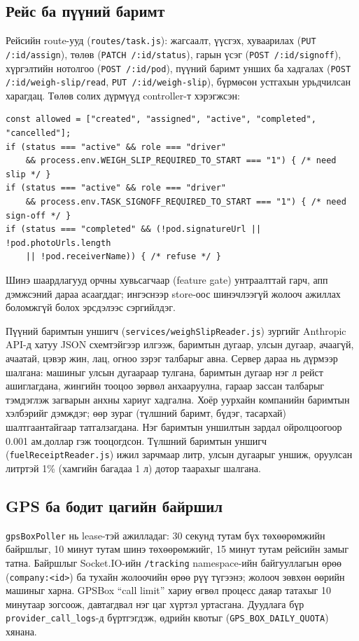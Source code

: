 \documentclass[
12pt,
oneside,
english,
onehalfspacing,
nolistspacing,
headsepline,
]{MUST-Thesis}
\begin{document}
\subsection{Рейс ба пүүний баримт}

Рейсийн route-ууд (\texttt{routes/task.js}): жагсаалт, үүсгэх, хуваарилах (\texttt{PUT /:id/assign}), төлөв (\texttt{PATCH /:id/status}), гарын үсэг (\texttt{POST /:id/signoff}), хүргэлтийн нотолгоо (\texttt{POST /:id/pod}), пүүний баримт унших ба хадгалах (\texttt{POST /:id/weigh-slip/read}, \texttt{PUT /:id/weigh-slip}), бүрмөсөн устгахын урьдчилсан харагдац. Төлөв солих дүрмүүд controller-т хэрэгжсэн:

\begin{verbatim}
const allowed = ["created", "assigned", "active", "completed", "cancelled"];
if (status === "active" && role === "driver"
    && process.env.WEIGH_SLIP_REQUIRED_TO_START === "1") { /* need slip */ }
if (status === "active" && role === "driver"
    && process.env.TASK_SIGNOFF_REQUIRED_TO_START === "1") { /* need sign-off */ }
if (status === "completed" && (!pod.signatureUrl || !pod.photoUrls.length
    || !pod.receiverName)) { /* refuse */ }
\end{verbatim}

Шинэ шаардлагууд орчны хувьсагчаар (feature gate) унтраалттай гарч, апп дэмжсэний дараа асаагддаг; ингэснээр store-оос шинэчлээгүй жолооч ажиллах боломжгүй болох эрсдэлээс сэргийлдэг.

Пүүний баримтын уншигч (\texttt{services/weighSlipReader.js}) зургийг Anthropic API-д хатуу JSON схемтэйгээр илгээж, баримтын дугаар, улсын дугаар, ачаагүй, ачаатай, цэвэр жин, лац, огноо зэрэг талбарыг авна. Сервер дараа нь дүрмээр шалгана: машиныг улсын дугаараар тулгана, баримтын дугаар нэг л рейст ашиглагдана, жингийн тооцоо зөрвөл анхааруулна, гараар зассан талбарыг тэмдэглэж загварын анхны хариуг хадгална. Хоёр уурхайн компанийн баримтын хэлбэрийг дэмждэг; өөр зураг (түлшний баримт, бүдэг, тасархай) шалтгаантайгаар татгалзагдана. Нэг баримтын уншилтын зардал ойролцоогоор 0.001 ам.доллар гэж тооцогдсон. Түлшний баримтын уншигч (\texttt{fuelReceiptReader.js}) ижил зарчмаар литр, улсын дугаарыг уншиж, оруулсан литртэй 1\% (хамгийн багадаа 1 л) дотор таарахыг шалгана.

\subsection{GPS ба бодит цагийн байршил}

\texttt{gpsBoxPoller} нь lease-тэй ажилладаг: 30 секунд тутам бүх төхөөрөмжийн байршлыг, 10 минут тутам шинэ төхөөрөмжийг, 15 минут тутам рейсийн замыг татна. Байршлыг Socket.IO-ийн \texttt{/tracking} namespace-ийн байгууллагын өрөө (\texttt{company:<id>}) ба тухайн жолоочийн өрөө рүү түгээнэ; жолооч зөвхөн өөрийн машиныг харна. GPSBox ``call limit'' хариу өгвөл процесс даяар татахыг 10 минутаар зогсоож, давтагдвал нэг цаг хүртэл уртасгана. Дуудлага бүр \texttt{provider\_call\_logs}-д бүртгэгдэж, өдрийн квотыг (\texttt{GPS\_BOX\_DAILY\_QUOTA}) хянана.
\end{document}
